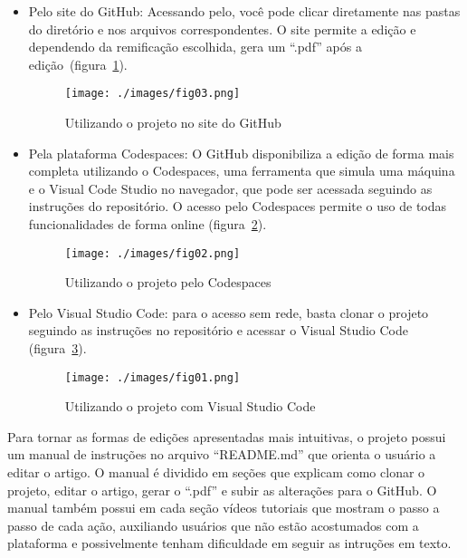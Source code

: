 \begin{itemize}
	\item Pelo  site do GitHub: Acessando pelo, você pode clicar diretamente nas pastas do diretório e nos arquivos correspondentes. O site permite a edição e dependendo da remificação escolhida, gera um ``.pdf'' após a edição~(figura~\ref{fig:fig01}).
	
	\begin{figure}[H]
		\centering
		\texttt{[image: ./images/fig03.png]}
		\caption{Utilizando o projeto no site do GitHub}
		\label{fig:fig01}
	\end{figure}

	\item Pela plataforma Codespaces: O GitHub disponibiliza a edição  de forma mais completa utilizando o Codespaces, uma ferramenta que simula uma máquina e o Visual Code Studio no navegador, que pode ser acessada seguindo as instruções do repositório. O acesso pelo Codespaces permite o uso de todas funcionalidades de forma online (figura~\ref{fig:fig02}).
	
	\begin{figure}[H]
		\centering
		\texttt{[image: ./images/fig02.png]}
		\caption{Utilizando o projeto pelo Codespaces}
		\label{fig:fig02}
	\end{figure}

	\item Pelo Visual Studio Code: para o acesso sem rede, basta clonar o projeto seguindo as instruções no repositório e acessar o Visual Studio Code (figura~\ref{fig:fig03}).
	
	\begin{figure}[H]
		\centering
		\texttt{[image: ./images/fig01.png]}
		\caption{Utilizando o projeto com Visual Studio Code}
		\label{fig:fig03}
	\end{figure}
\end{itemize}

Para tornar as formas de edições apresentadas mais intuitivas, o projeto possui um manual de instruções no arquivo ``README.md'' que orienta o usuário a editar o artigo. O manual é dividido em seções que explicam como clonar o projeto, editar o artigo, gerar o ``.pdf'' e subir as alterações para o GitHub. O manual também possui em cada seção vídeos tutoriais que mostram o passo a passo de cada ação, auxiliando usuários que não estão acostumados com a plataforma e possivelmente tenham dificuldade em seguir as intruções em texto.

